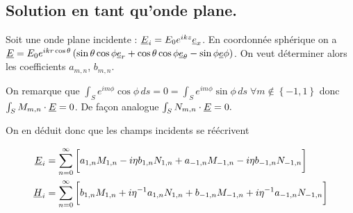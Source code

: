 \subsection{Solution en tant qu'onde plane.}

Soit une onde plane incidente : $\underline{E}_i = E_0 e^{ikz}\underline{e}_x$. En coordonnée sphérique on a $\underline{E} = E_0e^{ikr\cos\theta}\left(\sin\theta\cos\phi\underline{e}_r + \cos\theta\cos\phi\underline{e}_\theta - \sin\phi \underline{e} \phi\right)$. On veut déterminer alors les coefficients $a_{m,n}$, $b_{m,n}$.

On remarque que $\int_S e^{im\phi} \cos\phi \, ds = 0 = \int_S e^{im\phi} \sin\phi \,ds\; \forall m \not \in \left\lbrace -1,1 \right\rbrace$ donc $\int_S M_{m,n} \cdot \underline{E} = 0$. De façon analogue $\int_S N_{m,n} \cdot \underline{E} = 0.$

On en déduit donc que les champs incidents se réécrivent

\begin{align*}
    \underline{E}_i &= \sum\limits_{n=0}^\infty\bigg[ 
    a_{1,n}  M_{1,n} - i \eta b_{1,n} N_{1,n}
    + a_{-1,n}  M_{-1,n} - i \eta b_{-1,n} N_{-1,n}
    \bigg]\\
    \underline{H}_i &= \sum\limits_{n=0}^\infty\bigg[
    b_{1,n}  M_{1,n} + i {\eta}^{-1} a_{1,n} N_{1,n}
    + b_{-1,n}  M_{-1,n} + i {\eta}^{-1} a_{-1,n} N_{-1,n}
    \bigg]
\end{align*}






